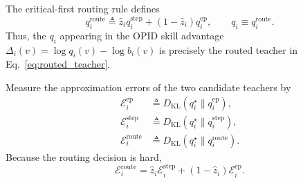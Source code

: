 The critical-first routing rule defines
\begin{equation}
 q_i^{\mathrm{route}}
 \triangleq
 \widehat z_i q_i^{\mathrm{step}}
 +
 \left(
   1-\widehat z_i
 \right)
 q_i^{\mathrm{ep}},
 \qquad
 q_i\equiv q_i^{\mathrm{route}}.
\label{eq:routed_teacher}
\end{equation}
Thus, the \(q_i\) appearing in the OPID skill advantage
\(\Delta_i(v)=\log q_i(v)-\log b_i(v)\) is precisely the routed teacher in
Eq.~\ref{eq:routed_teacher}.

Measure the approximation errors of the two candidate teachers by
\begin{equation}
\begin{aligned}
 \mathcal E_i^{\mathrm{ep}}
 &\triangleq
 D_{\mathrm{KL}}
 \left(
   q_i^\star\|q_i^{\mathrm{ep}}
 \right),
 \\
 \mathcal E_i^{\mathrm{step}}
 &\triangleq
 D_{\mathrm{KL}}
 \left(
   q_i^\star\|q_i^{\mathrm{step}}
 \right),
 \\
 \mathcal E_i^{\mathrm{route}}
 &\triangleq
 D_{\mathrm{KL}}
 \left(
   q_i^\star\|q_i^{\mathrm{route}}
 \right).
\end{aligned}
\label{eq:routing_errors}
\end{equation}
Because the routing decision is hard,
\begin{equation*}
 \mathcal E_i^{\mathrm{route}}
 =
 \widehat z_i
 \mathcal E_i^{\mathrm{step}}
 +
 \left(
   1-\widehat z_i
 \right)
 \mathcal E_i^{\mathrm{ep}}.
\end{equation*}

